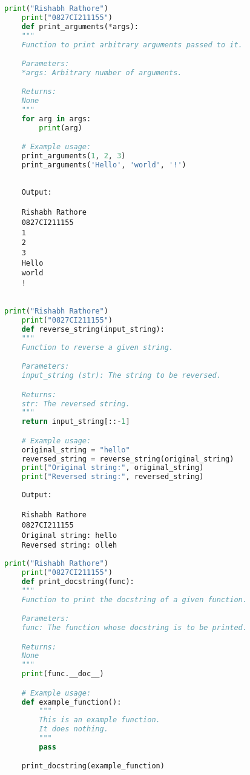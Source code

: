 \documentclass{report}
\begin{document}
\newpage


\sol 
\begin{lstlisting}[language=Python]
	print("Rishabh Rathore")
	print("0827CI211155")
	def print_arguments(*args):
    """
    Function to print arbitrary arguments passed to it.

    Parameters:
    *args: Arbitrary number of arguments.

    Returns:
    None
    """
    for arg in args:
        print(arg)

	# Example usage:
	print_arguments(1, 2, 3)
	print_arguments('Hello', 'world', '!')
  

\end{lstlisting}

\begin{verbatim}
	Output:

	Rishabh Rathore
	0827CI211155
	1
	2
	3
	Hello
	world
	!
		

\end{verbatim}


\newpage


\sol 
\begin{lstlisting}[language=Python]
	print("Rishabh Rathore")
	print("0827CI211155")
	def reverse_string(input_string):
    """
    Function to reverse a given string.

    Parameters:
    input_string (str): The string to be reversed.

    Returns:
    str: The reversed string.
    """
    return input_string[::-1]

	# Example usage:
	original_string = "hello"
	reversed_string = reverse_string(original_string)
	print("Original string:", original_string)
	print("Reversed string:", reversed_string)

\end{lstlisting}

\begin{verbatim}
	Output:

	Rishabh Rathore
	0827CI211155
	Original string: hello
	Reversed string: olleh

\end{verbatim}


\newpage


\sol 
\begin{lstlisting}[language=Python]
	print("Rishabh Rathore")
	print("0827CI211155")
	def print_docstring(func):
    """
    Function to print the docstring of a given function.

    Parameters:
    func: The function whose docstring is to be printed.

    Returns:
    None
    """
    print(func.__doc__)

	# Example usage:
	def example_function():
		"""
		This is an example function.
		It does nothing.
		"""
		pass

	print_docstring(example_function)

\end{lstlisting}
\end{document}
